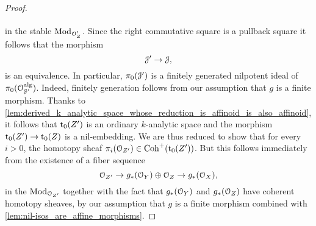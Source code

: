 \documentclass[10pt,a4paper,reqno]{amsart} %
\theoremstyle{plain}
\theoremstyle{definition}
\theoremstyle{remark}
\numberwithin{equation}{section}
\begin{document}
\begin{proof}
\[\begin{tikzcd}
        \end{tikzcd}
        \]
    in the stable \infcat $\mathrm{Mod}_{\mathcal O_Z'}$. Since the right commutative square is a pullback square it follows that the morphism
        \[
            \mathcal J' \to \mathcal J,  
        \]
    is an equivalence. In particular, $\pi_0(\mathcal J')$ is a finitely generated
    nilpotent ideal of $\pi_0(\mathcal O^\mathrm{alg}_{\mathcal J'})$. Indeed, finitely generation follows from our assumption that $g$ is a finite morphism.
    Thanks to \cref{lem:derived_k_analytic_space_whose_reduction_is_affinoid_is_also_affinoid},
    it follows that $\mathrm{t}_0(Z')$ is an ordinary $k$-analytic space and the morphism $\mathrm{t}_0(Z') \to \mathrm{t}_0(Z)$ is a nil-embedding. We are thus reduced to show that
    for every $i>0$, the homotopy sheaf $\pi_i(\mathcal O_{Z'}) \in \mathrm{Coh}^+(\mathrm{t}_0(Z'))$. But this follows immediately from the existence of a fiber sequence
        \[
            \mathcal O_{Z'} \to g_*(\mathcal O_Y) \oplus \mathcal O_Z \to g_*(\mathcal O_X),  
        \]
    in the \infcat $\mathrm{Mod}_{\mathcal O_{Z'}}$ together with the fact that $g_*(\mathcal O_Y)$ and $g_*(\mathcal O_Z)$ have coherent homotopy sheaves, by our assumption that $g$ is a
    finite morphism combined with \cref{lem:nil-isos_are_affine_morphisms}.
\end{proof}
\end{document}
